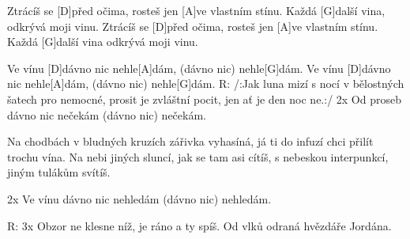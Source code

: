 
Ztrácíš se [D]před očima, rosteš jen [A]ve vlastním stínu.
Každá [G]další vina, odkrývá moji vinu.
Ztrácíš se [D]před očima, rosteš jen [A]ve vlastním stínu.
Každá [G]další vina odkrývá moji vinu.

Ve vínu [D]dávno nic nehle[A]dám, (dávno nic) nehle[G]dám.
Ve vínu [D]dávno nic nehle[A]dám, (dávno nic) nehle[G]dám.
R:
/:Jak luna mizí s nocí v bělostných šatech pro nemocné,
prosit je zvláštní pocit, jen ať je den noc ne.:/
2x Od proseb dávno nic nečekám (dávno nic) nečekám.

Na chodbách v bludných kruzích zářivka vyhasíná,
já ti do infuzí chci přilít trochu vína.
Na nebi jiných sluncí, jak se tam asi cítíš,
s nebeskou interpunkcí, jiným tulákům svítíš.

2x Ve vínu dávno nic nehledám (dávno nic) nehledám.

R:
3x Obzor ne klesne níž, je ráno a ty spíš.
Od vlků odraná hvězdáře Jordána.